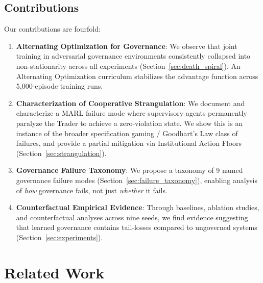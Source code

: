 \documentclass[11pt]{article}
\begin{document}
\subsection{Contributions}
Our contributions are fourfold:
\begin{enumerate}[leftmargin=*]
    \item \textbf{Alternating Optimization for Governance}: We observe that joint training in adversarial governance environments consistently collapsed into non-stationarity across all experiments (Section~\ref{sec:death_spiral}). An Alternating Optimization curriculum stabilizes the advantage function across 5{,}000-episode training runs.
    \item \textbf{Characterization of Cooperative Strangulation}: We document and characterize a MARL failure mode where supervisory agents permanently paralyze the Trader to achieve a zero-violation state. We show this is an instance of the broader specification gaming / Goodhart's Law class of failures, and provide a partial mitigation via Institutional Action Floors (Section~\ref{sec:strangulation}).
    \item \textbf{Governance Failure Taxonomy}: We propose a taxonomy of 9 named governance failure modes (Section~\ref{sec:failure_taxonomy}), enabling analysis of \emph{how} governance fails, not just \emph{whether} it fails.
    \item \textbf{Counterfactual Empirical Evidence}: Through baselines, ablation studies, and counterfactual analyses across nine seeds, we find evidence suggesting that learned governance contains tail-losses compared to ungoverned systems (Section~\ref{sec:experiments}).
\end{enumerate}

\section{Related Work}
\label{sec:related}
\end{document}

